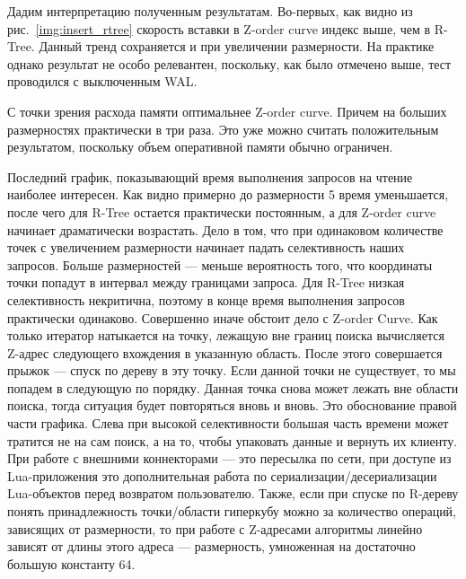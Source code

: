Дадим интерпретацию полученным результатам. Во-первых, как видно
из рис.~\ref{img:insert_rtree} скорость вставки в Z-order curve индекс выше, чем в R-Tree. Данный тренд сохраняется и при увеличении размерности. На практике однако результат не особо релевантен,
поскольку, как было отмечено выше, тест проводился с выключенным WAL.

С точки зрения расхода памяти оптимальнее Z-order curve.
Причем на больших размерностях практически в три раза.
Это уже можно считать положительным результатом, поскольку
объем оперативной памяти обычно ограничен.

Последний график, показывающий время выполнения запросов на чтение наиболее интересен.
Как видно примерно до размерности 5 время уменьшается,
после чего для R-Tree остается практически постоянным, а для Z-order
curve начинает драматически возрастать.
Дело в том, что при одинаковом количестве точек с увеличением размерности
начинает падать селективность наших запросов. Больше размерностей ---
меньше вероятность того, что координаты точки попадут в интервал между
границами запроса. Для R-Tree низкая селективность некритична,
поэтому в конце время выполнения запросов практически одинаково.
Совершенно иначе обстоит дело с Z-order Curve.
Как только итератор натыкается на точку, лежащую вне границ поиска
вычисляется Z-адрес следующего вхождения в указанную область.
После этого совершается прыжок --- спуск по дереву в эту точку.
Если данной точки не существует, то мы попадем в следующую по порядку.
Данная точка снова может лежать вне области поиска, тогда ситуация будет повторяться вновь и вновь. Это обоснование правой части графика.
Слева при высокой селективности большая часть времени может тратится
не на сам поиск, а на то, чтобы упаковать данные и вернуть их клиенту.
При работе с внешними коннекторами --- это пересылка по сети,
при доступе из Lua-приложения это дополнительная работа по сериализации/десериализации Lua-объектов перед возвратом пользователю.
Также, если при спуске по R-дереву понять принадлежность точки/области гиперкубу 
можно за количество операций, зависящих от размерности,
то при работе с Z-адресами алгоритмы линейно зависят от длины этого адреса ---
размерность, умноженная на достаточно большую константу 64.
